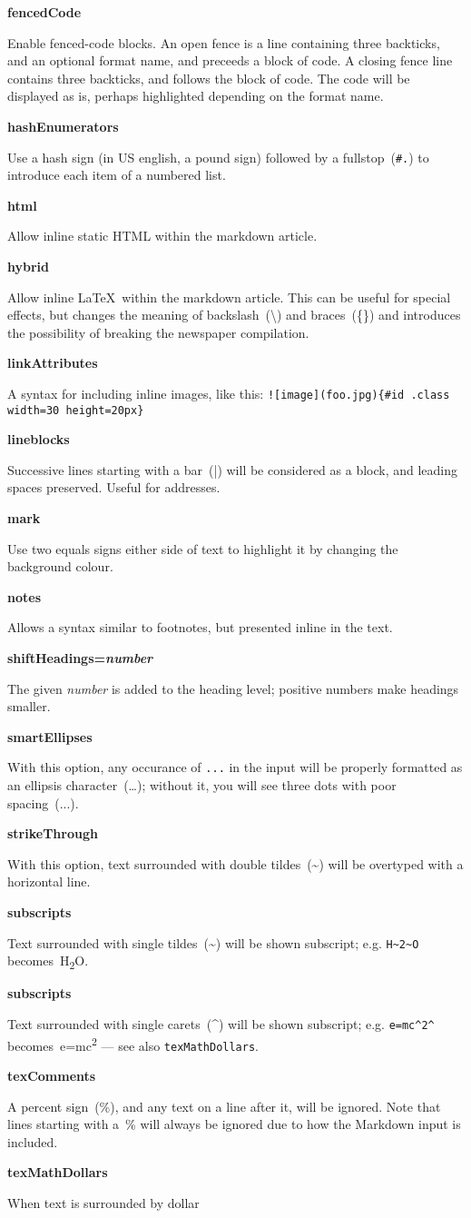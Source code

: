 \documentclass[a4paper,DIV=11]{scrartcl}
\newcommand{\deft}[2]{\nopagebreak\noindent\hspace{0.5in}\textbf{#1}\par\noindent{}#2\pagebreak[1]\par}
\begin{document}
\begin{multicols}{2}
{    \deft{fencedCode}{Enable fenced-code blocks. An open fence is a line
      containing three backticks, and an optional format name, and
      preceeds a block of code. A closing fence line contains three
      backticks, and follows the block of code. The code will be displayed
      as is, perhaps highlighted depending on the format name.
    }
    \deft{hashEnumerators}{Use a hash sign (in US english, a pound
      sign) followed by a fullstop~(\texttt{\#.}) to introduce each item
      of a numbered list.}
    \deft{html}{Allow inline static HTML within the markdown article.}
    \deft{hybrid}{Allow inline \LaTeX\ within the markdown
      article. This can be useful for special effects, but changes the
      meaning of backslash~(\textbackslash) and braces~(\{\}) and
      introduces the possibility of breaking the newspaper compilation.}
    \deft{linkAttributes}{A syntax for including inline images,
      like this: \texttt{![image](foo.jpg)\{\#id .class width=30
        height=20px\}}}
    \deft{lineblocks}{Successive lines starting with a bar~(|) will be
      considered as a block, and leading spaces preserved. Useful for
      addresses.}
    \deft{mark}{Use two equals signs either side of text to
      highlight it by changing the background colour.}
    \deft{notes}{Allows a syntax similar to footnotes, but
      presented inline in the text.}
    \deft{shiftHeadings=\textit{number}}{The given \textit{number} is
      added to the heading level; positive numbers make headings
      smaller.}
    \deft{smartEllipses}{With this option, any occurance of
      \texttt{...} in the input will be properly formatted as an
      ellipsis character~(\dots); without it, you will see three dots
      with poor spacing~(...).}
    \deft{strikeThrough}{With this option, text surrounded with
      double tildes~(\textasciitilde) will be overtyped with a horizontal line.}
    \deft{subscripts}{Text surrounded with single tildes~(\textasciitilde)
      will be shown subscript; e.g. \texttt{H\textasciitilde2\textasciitilde O}
      becomes~H\textsubscript{2}O.}
    \deft{subscripts}{Text surrounded with single carets~(\textasciicircum)
      will be shown subscript; e.g. \texttt{e=mc\textasciicircum2\textasciicircum}
      becomes~e=mc\textsuperscript{2} --- see also \texttt{texMathDollars}.}
    \deft{texComments}{A percent sign~(\%), and any text on a line
      after it, will be ignored. Note that lines starting with a~\%
      will always be ignored due to how the Markdown input is included.}
    \deft{texMathDollars}{When text is surrounded by dollar
}}
\end{multicols}
\end{document}
